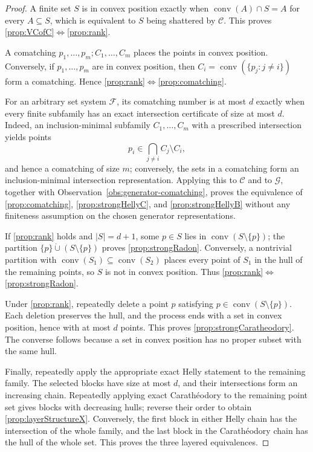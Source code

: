 \documentclass[11pt]{article}
\theoremstyle{definition}
\newcommand{\F}{\mathcal{F}}
\newcommand{\C}{\mathcal{C}}
\newcommand{\G}{\mathcal{G}}
\newcommand{\conv}{\operatorname{conv}}
\begin{document}
\begin{proof}
A finite set $S$ is in convex position exactly when $\conv(A)\cap S=A$ for every $A\subseteq S$, which is equivalent to $S$ being shattered by $\C$. This proves \ref{prop:VCofC}$\Leftrightarrow$\ref{prop:rank}.

A comatching $p_1,\ldots,p_m;C_1,\ldots,C_m$ places the points in convex position. Conversely, if $p_1,\ldots,p_m$ are in convex position, then $C_i=\conv(\{p_j:j\ne i\})$ form a comatching. Hence \ref{prop:rank}$\Leftrightarrow$\ref{prop:comatching}.

For an arbitrary set system $\F$, its comatching number is at most $d$ exactly when every finite subfamily has an exact intersection certificate of size at most $d$. Indeed, an inclusion-minimal subfamily $C_1,\ldots,C_m$ with a prescribed intersection yields points
\[
p_i\in\bigcap_{j\ne i}C_j\setminus C_i,
\]
and hence a comatching of size $m$; conversely, the sets in a comatching form an inclusion-minimal intersection representation. Applying this to $\C$ and to $\G$, together with Observation~\ref{obs:generator-comatching}, proves the equivalence of \ref{prop:comatching}, \ref{prop:strongHellyC}, and \ref{prop:strongHellyB} without any finiteness assumption on the chosen generator representations.

If \ref{prop:rank} holds and $|S|=d+1$, some $p\in S$ lies in $\conv(S\setminus\{p\})$; the partition $\{p\}\mathbin{\dot\cup}(S\setminus\{p\})$ proves \ref{prop:strongRadon}. Conversely, a nontrivial partition with $\conv(S_1)\subseteq\conv(S_2)$ places every point of $S_1$ in the hull of the remaining points, so $S$ is not in convex position. Thus \ref{prop:rank}$\Leftrightarrow$\ref{prop:strongRadon}.

Under \ref{prop:rank}, repeatedly delete a point $p$ satisfying $p\in\conv(S\setminus\{p\})$. Each deletion preserves the hull, and the process ends with a set in convex position, hence with at most $d$ points. This proves \ref{prop:strongCaratheodory}. The converse follows because a set in convex position has no proper subset with the same hull.

Finally, repeatedly apply the appropriate exact Helly statement to the remaining family. The selected blocks have size at most $d$, and their intersections form an increasing chain. Repeatedly applying exact Carath\'eodory to the remaining point set gives blocks with decreasing hulls; reverse their order to obtain \ref{prop:layerStructureX}. Conversely, the first block in either Helly chain has the intersection of the whole family, and the last block in the Carath\'eodory chain has the hull of the whole set. This proves the three layered equivalences.
\end{proof}
\end{document}
